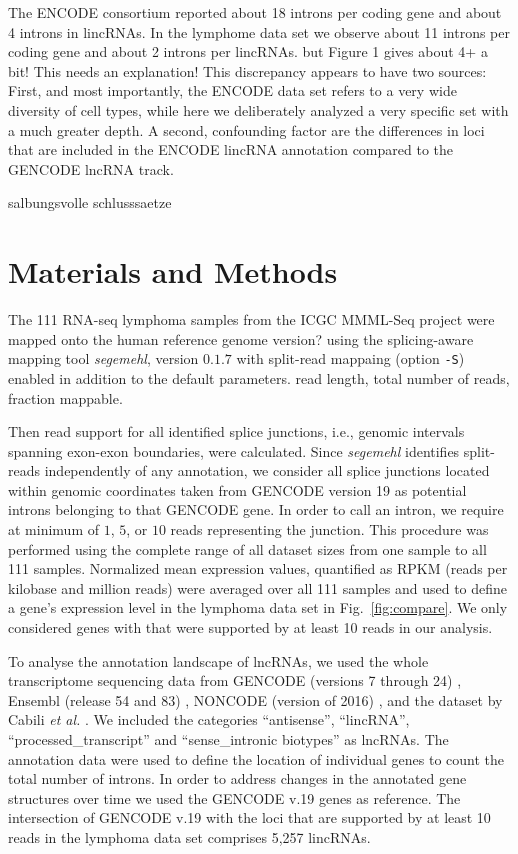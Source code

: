 \documentclass[ncrna,article,submit,moreauthors,pdftex,10pt,a4paper]{mdpi}
\newcommand{\TODO}[1]{\begingroup\color{red}#1\endgroup}
\begin{document}
The ENCODE consortium reported about 18 introns per coding gene and about 4
introns in lincRNAs. In the lymphome data set we observe about 11 introns
per coding gene and about 2 introns per lincRNAs. \TODO{but Figure 1 gives
  about 4+ a bit! This needs an explanation!} This discrepancy appears to
have two sources: First, and most importantly, the ENCODE data set refers
to a very wide diversity of cell types, while here we deliberately analyzed
a very specific set with a much greater depth. A second, confounding factor
are the differences in loci that are included in the ENCODE lincRNA
annotation compared to the GENCODE lncRNA track.

\TODO{salbungsvolle schlusssaetze} 

\section{Materials and Methods}

The 111 RNA-seq lymphoma samples from the ICGC MMML-Seq project
\cite{Richter:12a} were mapped onto the human reference genome
\TODO{version?} using the splicing-aware mapping tool \textit{segemehl},
version $0.1.7$ \cite{Hoffmann:09a,Hoffmann:14a} with split-read mappaing
(option \texttt{-S}) enabled in addition to the default parameters.
\TODO{read length, total number of reads, fraction mappable.} 

Then read support for all identified splice junctions, i.e., genomic
intervals spanning exon-exon boundaries, were calculated. Since
\textit{segemehl} identifies split-reads independently of any annotation,
we consider all splice junctions located within genomic coordinates taken
from GENCODE version 19 as potential introns belonging to that GENCODE
gene. In order to call an intron, we require at minimum of $1$, $5$, or
$10$ reads representing the junction.  This procedure was performed using
the complete range of all dataset sizes from one sample to all 111 samples.
Normalized mean expression values, quantified as RPKM (reads per kilobase
and million reads) were averaged over all 111 samples and used to define a
gene's expression level in the lymphoma data set in Fig.\
\ref{fig:compare}. We only considered genes with that were supported by at
least 10 reads in our analysis.

To analyse the annotation landscape of lncRNAs, we used the whole
transcriptome sequencing data from GENCODE (versions 7 through 24)
\cite{harrow2012}, Ensembl (release 54 and 83) \cite{flicek2014}, NONCODE
(version of 2016) \cite{zhao2016}, and the dataset by Cabili \textit{et
  al.}  \cite{cabili2011}. We included the categories ``antisense'',
``lincRNA'', ``processed\_transcript'' and ``sense\_intronic biotypes'' as
lncRNAs.  The annotation data were used to define the location of
individual genes to count the total number of introns. In order to address
changes in the annotated gene structures over time we used the GENCODE v.19
genes as reference. The intersection of GENCODE v.19 with the loci that are
supported by at least 10 reads in the lymphoma data set comprises 5,257
lincRNAs.
\end{document}
